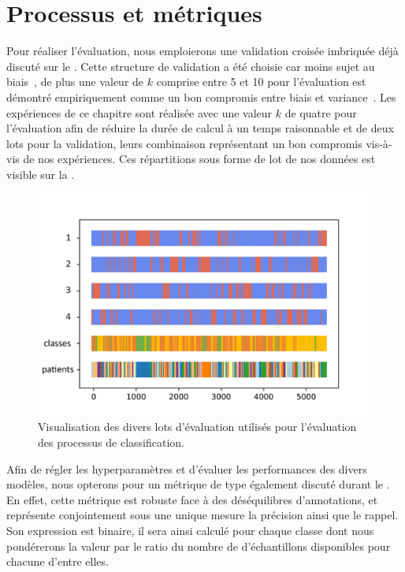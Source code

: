 \section{Processus et métriques}
Pour réaliser l'évaluation, nous emploierons une validation croisée imbriquée déjà discuté sur le . Cette structure de validation a été choisie car moins sujet au biais~\cite{Cawley2010}, de plus une valeur de $k$ comprise entre 5 et 10 pour l'évaluation est démontré empiriquement comme un bon compromis entre biais et variance~\cite{James2000}. Les expériences de ce chapitre sont réalisée avec une valeur $k$ de quatre pour l'évaluation afin de réduire la durée de calcul à un temps raisonnable et de deux lots pour la validation, leurs combinaison représentant un bon compromis vis-à-vis de nos expériences. Ces répartitions sous forme de lot de nos données est visible sur la .\par

\begin{figure}[H]
    \centering
    \includegraphics[width=0.7\linewidth]{contents/chapter_4/resources/visualisation_folds.png}
    \caption{Visualisation des divers lots d'évaluation utilisés pour l'évaluation des processus de classification.}
    \label{fig:visualisation_folds}
\end{figure}\par

Afin de régler les hyperparamètres et d'évaluer les performances des divers modèles, nous opterons pour un métrique de type \fscore{} également discuté durant le . En effet, cette métrique est robuste face à des déséquilibres d'annotations, et représente conjointement sous une unique mesure la précision ainsi que le rappel. Son expression est binaire, il sera ainsi calculé pour chaque classe dont nous pondérerons la valeur par le ratio du nombre de d'échantillons disponibles pour chacune d'entre elles.\par

